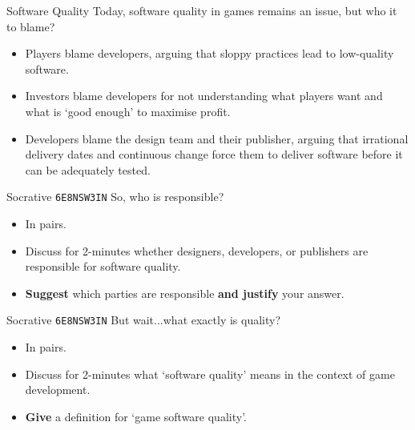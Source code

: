 \begin{frame}[fragile]{Software Quality}
	Today, software quality in games remains an issue, but who it to blame?
	
	\begin{itemize}
		\item Players blame developers, arguing that sloppy practices lead to low-quality software.
		\item Investors blame developers for not understanding what players want and what is `good enough' to maximise profit.
		\item Developers blame the design team and their publisher, arguing that irrational delivery dates and continuous
		change force them to deliver software before it can be adequately tested.
	\end{itemize}
\end{frame}

\begin{frame}[fragile]{Socrative \texttt{6E8NSW3IN}}
	So, who is responsible?
	\begin{itemize}
		\item In pairs.
		\item Discuss for 2-minutes whether designers, developers, or publishers are responsible for software quality.
		\item \textbf{Suggest} which parties are responsible \textbf{and justify} your answer. 
	\end{itemize}
\end{frame}

\begin{frame}[fragile]{Socrative \texttt{6E8NSW3IN}}
	But wait...what exactly is quality?
	
	\begin{itemize}
		\item In pairs.
		\item Discuss for 2-minutes what `software quality' means in the context of game development.
		\item \textbf{Give} a definition for `game software quality'. 
	\end{itemize}
\end{frame}

